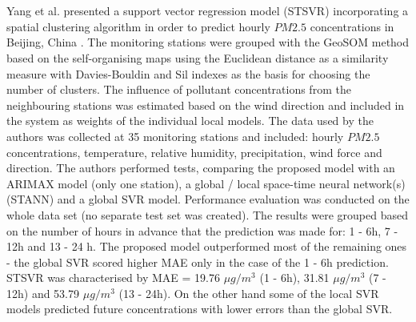 \\\\
Yang et al. presented a support vector regression model (STSVR) incorporating a spatial clustering algorithm in order to predict hourly $PM2.5$ concentrations in Beijing, China \cite{YANG201812}. The monitoring stations were grouped with the GeoSOM method based on the self-organising maps using the Euclidean distance as a similarity measure with Davies-Bouldin and Sil indexes as the basis for choosing the number of clusters. The influence of pollutant concentrations from the neighbouring stations was estimated based on the wind direction and included in the system as weights of the individual local models. The data used by the authors was collected at 35 monitoring stations and included: hourly $PM2.5$ concentrations, temperature, relative humidity, precipitation, wind force and direction. The authors performed tests, comparing the proposed model with an ARIMAX model (only one station), a global / local space-time neural network(s) (STANN) and a global SVR model. Performance evaluation was conducted on the whole data set (no separate test set was created). The results were grouped based on the number of hours in advance that the prediction was made for: 1 - 6h, 7 - 12h and 13 - 24 h. The proposed model outperformed most of the remaining ones - the global SVR scored higher MAE only in the case of the 1 - 6h prediction. STSVR was characterised by MAE = 19.76 $\mu g / m^3$ (1 - 6h), 31.81 $\mu g / m^3$ (7 - 12h) and 53.79 $\mu g / m^3$ (13 - 24h). On the other hand some of the local SVR models predicted future concentrations with lower errors than the global SVR.

